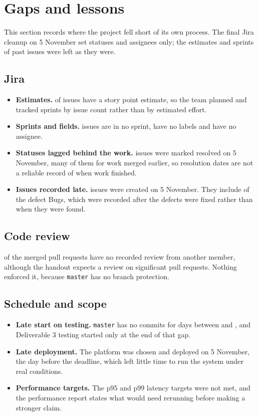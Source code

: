 \section{Gaps and lessons}\label{sec:gaps}

This section records where the project fell short of its own process. The final Jira cleanup on 5 November
set statuses and assignees only; the estimates and sprints of past issues were left as they were.

\subsection{Jira}
\begin{itemize}
  \item \textbf{Estimates.} \JiraWithEstimate{} of \JiraIssues{} issues have a story point estimate, so the
    team planned and tracked sprints by issue count rather than by estimated effort.
  \item \textbf{Sprints and fields.} \JiraNoSprint{} issues are in no sprint, \JiraNoLabels{} have no labels
    and \JiraUnassigned{} have no assignee.
  \item \textbf{Statuses lagged behind the work.} \JiraResolvedFinalDay{} issues were marked resolved on
    5 November, many of them for work merged earlier, so resolution dates are not a reliable record of when
    work finished.
  \item \textbf{Issues recorded late.} \JiraCreatedFinalDay{} issues were created on 5 November. They include
    \JiraDefectBugsFinalDay{} of the \JiraDefectBugs{} defect Bugs, which were recorded after the defects were
    fixed rather than when they were found.
\end{itemize}

\subsection{Code review}
\PullsNoReview{} of the \PullsMerged{} merged pull requests have no recorded review from another member,
although the handout expects a review on significant pull requests. Nothing enforced it, because
\texttt{master} has no branch protection.

\subsection{Schedule and scope}
\begin{itemize}
  \item \textbf{Late start on testing.} \texttt{master} has no commits for \CommitGapDays{} days between
    \CommitGapFrom{} and \CommitGapTo{}, and Deliverable 3 testing started only at the end of that gap.
  \item \textbf{Late deployment.} The platform was chosen and deployed on 5 November, the day before the
    deadline, which left little time to run the system under real conditions.
  \item \textbf{Performance targets.} The p95 and p99 latency targets were not met, and the performance report
    states what would need rerunning before making a stronger claim.
\end{itemize}

